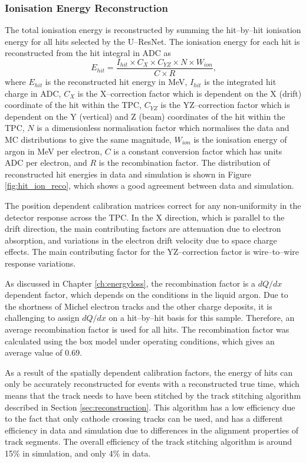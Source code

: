 \subsubsection{Ionisation Energy Reconstruction}

The total ionisation energy is reconstructed by summing the hit--by--hit
ionisation energy for all hits selected by the U--ResNet. The ionisation energy for
each hit is reconstructed from the hit integral in ADC as
\begin{equation*}
	E_{hit} = \frac{I_{hit} \times C_X \times C_{YZ} \times N \times W_{ion}}{C \times R}\mbox{,}
\end{equation*}
where $E_{hit}$ is the reconstructed hit energy in MeV, $I_{hit}$ is the
integrated hit charge in ADC, $C_X$ is the X--correction factor which is
dependent on the X (drift) coordinate of the hit within the TPC, $C_{YZ}$ is the
YZ--correction factor which is dependent on the Y (vertical) and Z (beam) 
coordinates of the hit within the TPC, $N$ is a dimensionless normalisation 
factor which normalises the data and MC distributions to give the same 
magnitude, $W_{ion}$ is the ionisation energy of argon in MeV per electron, 
$C$ is a constant conversion factor which has units ADC per electron, and $R$ 
is the recombination factor. The distribution of reconstructed hit energies in 
\protodune{} data and simulation is shown in Figure \ref{fig:hit_ion_reco}, 
which shows a good agreement between data and simulation.

The position dependent calibration matrices correct for any non-uniformity in 
the detector response across the TPC. In the X direction, which is parallel to 
the drift direction, the main contributing factors are attenuation due to 
electron absorption, and variations in the electron drift velocity due to 
space charge effects. The main contributing factor for the YZ--correction 
factor is wire--to--wire response variations.

As discussed in Chapter \ref{ch:energyloss}, the recombination factor is a
$dQ/dx$ dependent factor, which depends on the conditions in the liquid
argon. Due to the shortness of Michel electron tracks and the other charge
deposits, it is challenging to assign $dQ/dx$ on a hit--by--hit basis for this
sample. Therefore, an average recombination factor is used for all hits. The
recombination factor was calculated using the box model\cite{Acciarri2013a}
under \protodune{} operating conditions, which gives an average value of 0.69.

As a result of the spatially dependent calibration factors, the energy of hits
can only be accurately reconstructed for events with a reconstructed true
time, which means that the track needs to have been stitched by the track
stitching algorithm described in Section \ref{sec:reconstruction}. This 
algorithm has a low efficiency due to the fact that only cathode crossing 
tracks can be used, and has a different efficiency in data and simulation due 
to differences in the alignment properties of track segments. The overall 
efficiency of the track stitching algorithm is around 15\% in simulation, and 
only 4\% in data.

